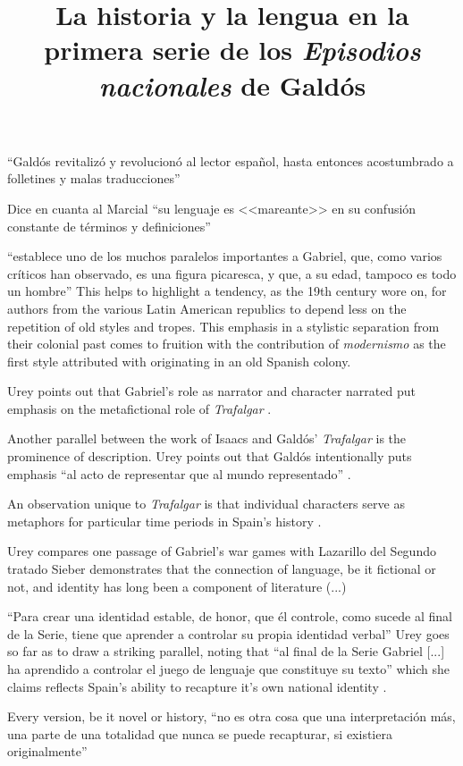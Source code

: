 \documentclass[12pt]{article}
\title{La historia y la lengua en la primera serie de los \textit{Episodios nacionales} de Galdós}
\makeatletter
\newcommand\iraggedright{%
	\let\\\@centercr\@rightskip\@flushglue \rightskip\@rightskip
	\leftskip\z@skip}
\makeatother
\begin{document}
	\makeheader
	\iraggedright
	
\enquote{Galdós revitalizó y revolucionó al lector español, hasta entonces acostumbrado a folletines y malas traducciones} \cite[1525]{Urey...}

Dice en cuanta al Marcial \enquote{su lenguaje es <<mareante>> en su confusión constante de términos y definiciones} \cite[1526]{Urey}

\enquote{establece uno de los muchos paralelos importantes a Gabriel, que, como varios críticos han observado, es una figura picaresca, y que, a su edad, tampoco es todo un hombre} \cite[1526]{Urey}
This helps to highlight a tendency, as the 19th century wore on, for authors from the various Latin American republics to depend less on the repetition of old styles and tropes.
This emphasis in a stylistic separation from their colonial past comes to fruition with the contribution of \textit{modernismo} as the first style attributed with originating in an old Spanish colony.

Urey points out that Gabriel's role as narrator and character narrated put emphasis on the metafictional role of \textit{Trafalgar} \cite[1526]{Urey}.

Another parallel between the work of Isaacs and Galdós' \textit{Trafalgar} is the prominence of description.
Urey points out that Galdós intentionally puts emphasis \enquote{al acto de representar que al mundo representado} \cite[1527]{Urey}.

An observation unique to \textit{Trafalgar} is that individual characters serve as metaphors for particular time periods in Spain's history \cite[1527]{Urey}. 

Urey compares one passage of Gabriel's war games with Lazarillo del Segundo tratado
Sieber demonstrates that the connection of language, be it fictional or not, and identity has long been a component of literature \nocite{Sieber1978}(...)



\enquote{Para crear una identidad estable, de honor, que él controle, como sucede al final de la Serie, tiene que aprender a controlar su propia identidad verbal} \cite[1531]{Urey}
Urey goes so far as to draw a striking parallel, noting that \enquote{al final de la Serie Gabriel [...] ha aprendido a controlar el juego de lenguaje que constituye su texto} which she claims reflects Spain's ability to recapture it's own national identity \cite[1532]{Urey}.

Every version, be it novel or history, \enquote{no es otra cosa que una interpretación más, una parte de una totalidad que nunca se puede recapturar, si existiera originalmente} \cite[1533]{Urey}

\makeworkscited
\listoftodos
\end{document}
